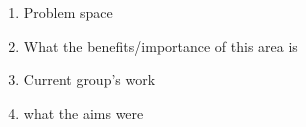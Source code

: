 \begin{enumerate}
  \item Problem space
  \item What the benefits/importance of this area is
  \item Current group's work
  \item what the aims were
\end{enumerate}